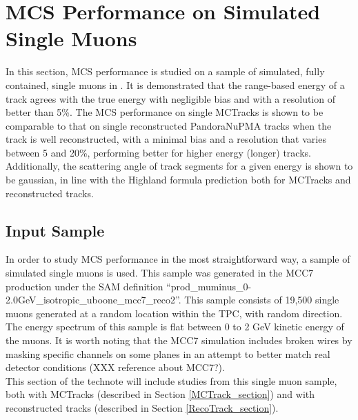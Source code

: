 
\section{MCS Performance on Simulated Single Muons}\label{singlemuon_MC_section}

In this section, MCS performance is studied on a sample of simulated, fully contained, single muons in {\ub}. It is demonstrated that the range-based energy of a track agrees with the true energy with negligible bias and with a resolution of better than 5\%. The MCS performance on single {\sc MCTracks} is shown to be comparable to that on single reconstructed PandoraNuPMA tracks when the track is well reconstructed, with a minimal bias and a resolution that varies between 5 and 20\%, performing better for higher energy (longer) tracks. Additionally, the scattering angle of track segments for a given energy is shown to be gaussian, in line with the Highland formula prediction both for {\sc MCTracks} and reconstructed tracks.


\subsection{Input Sample}\label{SingleMu_Input_Sample_section}
In order to study MCS performance in the most straightforward way, a sample of simulated single muons is used. This sample was generated in the {\ub} MCC7 production under the SAM definition ``prod\_muminus\_0-2.0GeV\_isotropic\_uboone\_mcc7\_reco2''. This sample consists of 19,500 single muons generated at a random location within the {\ub} TPC, with random direction. The energy spectrum of this sample is flat between 0 to 2 GeV kinetic energy of the muons. It is worth noting that the MCC7 simulation includes broken wires by masking specific channels on some planes in an attempt to better match real detector conditions (XXX reference about MCC7?).\\

This section of the technote will include studies from this single muon sample, both with {\sc MCTracks} (described in Section \ref{MCTrack_section}) and with reconstructed tracks (described in Section \ref{RecoTrack_section}).


